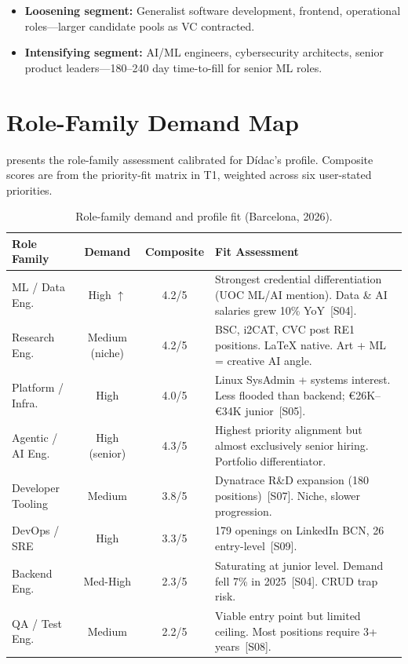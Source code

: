 \documentclass[a4paper,11pt,openany]{report}
\begin{document}
\begin{itemize}
  \item \textbf{Loosening segment:} Generalist software development, frontend,
    operational roles---larger candidate pools as VC contracted.
  \item \textbf{Intensifying segment:} AI/ML engineers, cybersecurity
    architects, senior product leaders---180--240 day time-to-fill for senior
    ML roles.
\end{itemize}

\section{Role-Family Demand Map}

 presents the role-family assessment calibrated for
Dídac's profile. Composite scores are from the priority-fit matrix in T1,
weighted across six user-stated priorities.

\begin{table}[htbp]
\centering
\caption{Role-family demand and profile fit (Barcelona, 2026).}
\label{tab:role-demand}
\small
\begin{tabularx}{\textwidth}{l c c X}
\toprule
\textbf{Role Family} & \textbf{Demand} & \textbf{Composite} & \textbf{Fit Assessment} \\
\midrule
ML / Data Eng.         & High $\uparrow$  & 4.2/5 & Strongest credential differentiation (UOC ML/AI mention). Data \& AI salaries grew 10\% YoY~[S04]. \\
Research Eng.          & Medium (niche)    & 4.2/5 & BSC, i2CAT, CVC post RE1 positions. LaTeX native. Art + ML = creative AI angle. \\
Platform / Infra.      & High              & 4.0/5 & Linux SysAdmin + systems interest. Less flooded than backend; €26K--€34K junior~[S05]. \\
Agentic / AI Eng.      & High (senior)     & 4.3/5 & Highest priority alignment but almost exclusively senior hiring. Portfolio differentiator. \\
Developer Tooling      & Medium            & 3.8/5 & Dynatrace R\&D expansion (180 positions)~[S07]. Niche, slower progression. \\
DevOps / SRE           & High              & 3.3/5 & 179 openings on LinkedIn BCN, 26 entry-level~[S09]. \\
Backend Eng.           & Med-High          & 2.3/5 & Saturating at junior level. Demand fell 7\% in 2025~[S04]. CRUD trap risk. \\
QA / Test Eng.         & Medium            & 2.2/5 & Viable entry point but limited ceiling. Most positions require 3+ years~[S08]. \\
\bottomrule
\end{tabularx}
\end{table}
\end{document}

